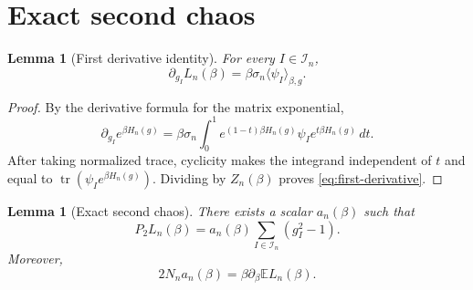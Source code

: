 \documentclass[11pt]{article}
\newtheorem{lemma}[theorem]{Lemma}
\newcommand{\E}{\mathbb{E}}
\newcommand{\tr}{\operatorname{tr}}
\newcommand{\calI}{\mathcal{I}}
\newcommand{\dd}{\,d}
\begin{document}
\section{Exact second chaos}

\begin{lemma}[First derivative identity]\label{lem:first-derivative}
  For every $I\in\calI_n$,
  \begin{equation}\label{eq:first-derivative}
    \partial_{g_I}L_n(\beta)=\beta\sigma_n\langle\psi_I\rangle_{\beta,g}.
  \end{equation}
\end{lemma}

\begin{proof}
  By the derivative formula for the matrix exponential,
  \begin{equation}\label{eq:exp-derivative}
    \partial_{g_I}e^{\beta H_n(g)}
    =
    \beta\sigma_n
    \int_0^1
      e^{(1-t)\beta H_n(g)}\psi_I e^{t\beta H_n(g)}
    \dd t.
  \end{equation}
  After taking normalized trace, cyclicity makes the integrand independent of
  $t$ and equal to $\tr(\psi_Ie^{\beta H_n(g)})$.  Dividing by $Z_n(\beta)$
  proves \eqref{eq:first-derivative}.
\end{proof}

\begin{lemma}[Exact second chaos]\label{lem:second-chaos}
  There exists a scalar $a_n(\beta)$ such that
  \begin{equation}\label{eq:p2-exact}
    P_2L_n(\beta)=a_n(\beta)\sum_{I\in\calI_n}(g_I^2-1).
  \end{equation}
  Moreover,
  \begin{equation}\label{eq:an-coeff}
    2N_na_n(\beta)=\beta\partial_\beta\E L_n(\beta).
  \end{equation}
\end{lemma}
\end{document}
